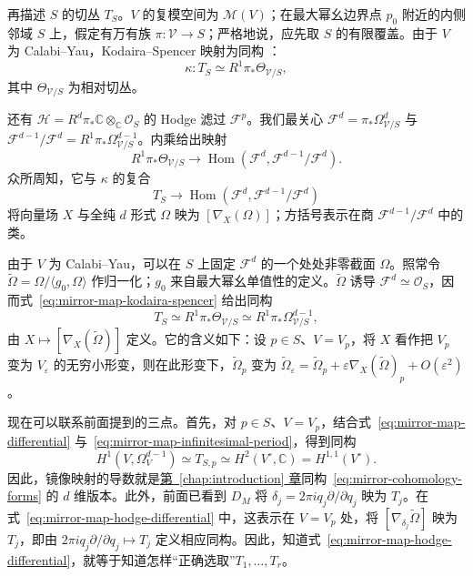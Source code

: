 再描述 $S$ 的切丛 $T_S$。$V$ 的复模空间为 $\mathcal M(V)$；在最大幂幺边界点 $p_0$ 附近的内侧邻域 $S$ 上，假定有万有族 $\pi:\mathcal V\to S$；严格地说，应先取 $S$ 的有限覆盖。由于 $V$ 为 Calabi--Yau，Kodaira--Spencer 映射为同构 ：
\[
\kappa:T_S\simeq R^1\pi_*\Theta_{\mathcal V/S},
\]
其中 $\Theta_{\mathcal V/S}$ 为相对切丛。

还有 $\mathcal H=R^d\pi_*\mathbb C\otimes_{\mathbb C}\mathcal O_S$ 的 Hodge 滤过 $\mathcal F^p$。我们最关心
$\mathcal F^d=\pi_*\Omega^d_{\mathcal V/S}$ 与
$\mathcal F^{d-1}/\mathcal F^d=R^1\pi_*\Omega^{d-1}_{\mathcal V/S}$。内乘给出映射
\begin{equation}\label{eq:mirror-map-contraction}
R^1\pi_*\Theta_{\mathcal V/S}
\longrightarrow\operatorname{Hom}(\mathcal F^d,\mathcal F^{d-1}/\mathcal F^d).
\end{equation}
众所周知，它与 $\kappa$ 的复合
\begin{equation}\label{eq:mirror-map-kodaira-spencer}
T_S\longrightarrow\operatorname{Hom}(\mathcal F^d,\mathcal F^{d-1}/\mathcal F^d)
\end{equation}
将向量场 $X$ 与全纯 $d$ 形式 $\Omega$ 映为 $[\nabla_X(\Omega)]$；方括号表示在商 $\mathcal F^{d-1}/\mathcal F^d$ 中的类。

由于 $V$ 为 Calabi--Yau，可以在 $S$ 上固定 $\mathcal F^d$ 的一个处处非零截面 $\Omega$。照常令 $\widetilde\Omega=\Omega/\langle g_0,\Omega\rangle$ 作归一化；$g_0$ 来自最大幂幺单值性的定义。$\widetilde\Omega$ 诱导 $\mathcal F^d\simeq\mathcal O_S$，因而式~\eqref{eq:mirror-map-kodaira-spencer} 给出同构
\begin{equation}\label{eq:mirror-map-infinitesimal-period}
T_S\simeq R^1\pi_*\Theta_{\mathcal V/S}
\simeq R^1\pi_*\Omega^{d-1}_{\mathcal V/S},
\end{equation}
由 $X\mapsto[\nabla_X(\widetilde\Omega)]$ 定义。它的含义如下：设 $p\in S$、$V=V_p$，将 $X$ 看作把 $V_p$ 变为 $V_\varepsilon$ 的无穷小形变，则在此形变下，$\widetilde\Omega_p$ 变为
$\widetilde\Omega_\varepsilon=\widetilde\Omega_p+\varepsilon\nabla_X(\widetilde\Omega)_p+O(\varepsilon^2)$。

现在可以联系前面提到的三点。首先，对 $p\in S$、$V=V_p$，结合式~\eqref{eq:mirror-map-differential} 与~\eqref{eq:mirror-map-infinitesimal-period}，得到同构
\begin{equation}\label{eq:mirror-map-hodge-differential}
H^1(V,\Omega_V^{d-1})\simeq T_{S,p}
\simeq H^2(V^\circ,\mathbb C)=H^{1,1}(V^\circ).
\end{equation}
因此，镜像映射的导数就是\hyperref[chap:introduction]{第~\ref*{chap:introduction} 章}同构~\eqref{eq:mirror-cohomology-forms} 的 $d$ 维版本。此外，前面已看到 $D_M$ 将 $\delta_j=2\pi iq_j\partial/\partial q_j$ 映为 $T_j$。在式~\eqref{eq:mirror-map-hodge-differential} 中，这表示在 $V=V_p$ 处，将 $[\nabla_{\delta_j}\widetilde\Omega]$ 映为 $T_j$，即由 $2\pi iq_j\partial/\partial q_j\mapsto T_j$ 定义相应同构。因此，知道式~\eqref{eq:mirror-map-hodge-differential}，就等于知道怎样“正确选取”$T_1,\ldots,T_r$。

